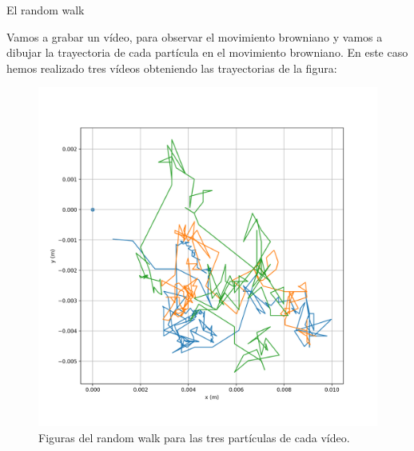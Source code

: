\documentclass{beamer}
\begin{document}
\begin{frame}{El random walk}

Vamos a grabar un vídeo, para observar el movimiento browniano y vamos a dibujar la trayectoria de cada partícula en el movimiento browniano. En este caso hemos realizado tres vídeos obteniendo las trayectorias de la figura:

\begin{figure}[h!]
\begin{center}
\includegraphics[scale=0.23]{Random walk.png}
\caption{Figuras del random walk para las tres partículas de cada vídeo.}
\end{center}
\end{figure}
\end{frame}
\end{document}
